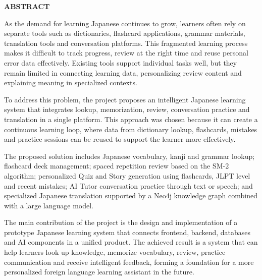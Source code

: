 \documentclass[../DoAn.tex]{subfiles}
\begin{document}
\begin{center}
    \Large{\textbf{ABSTRACT}}\\
\end{center}
\vspace{1cm}

As the demand for learning Japanese continues to grow, learners often rely on separate tools such as dictionaries, flashcard applications, grammar materials, translation tools and conversation platforms. This fragmented learning process makes it difficult to track progress, review at the right time and reuse personal error data effectively. Existing tools support individual tasks well, but they remain limited in connecting learning data, personalizing review content and explaining meaning in specialized contexts.

To address this problem, the project proposes an intelligent Japanese learning system that integrates lookup, memorization, review, conversation practice and translation in a single platform. This approach was chosen because it can create a continuous learning loop, where data from dictionary lookup, flashcards, mistakes and practice sessions can be reused to support the learner more effectively.

The proposed solution includes Japanese vocabulary, kanji and grammar lookup; flashcard deck management; spaced repetition review based on the SM-2 algorithm; personalized Quiz and Story generation using flashcards, JLPT level and recent mistakes; AI Tutor conversation practice through text or speech; and specialized Japanese translation supported by a Neo4j knowledge graph combined with a large language model.

The main contribution of the project is the design and implementation of a prototype Japanese learning system that connects frontend, backend, databases and AI components in a unified product. The achieved result is a system that can help learners look up knowledge, memorize vocabulary, review, practice communication and receive intelligent feedback, forming a foundation for a more personalized foreign language learning assistant in the future.
\end{document}

